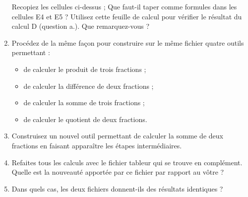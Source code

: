 \begin{TP}
\begin{enumerate}
    Recopiez les cellules ci-dessus ;
    Que faut-il taper comme formules dans les cellules E4 et E5 ?
    Utilisez cette feuille de calcul pour vérifier le résultat du calcul D (question a.). Que remarquez-vous ?
    \item Procédez de la même façon pour construire sur le même fichier quatre outils permettant :
    \begin{itemize}
        \item de calculer le produit de trois fractions ;
        \item de calculer la différence de deux fractions ;
        \item de calculer la somme de trois fractions ;
        \item de calculer le quotient de deux fractions.
    \end{itemize}
    \item Construisez un nouvel outil permettant de calculer la somme de deux fractions en faisant apparaître les étapes intermédiaires.
    \item Refaites tous les calculs avec le fichier tableur qui se trouve en complément. Quelle est la nouveauté apportée par ce fichier par rapport au vôtre ?
    \item Dans quels cas, les deux fichiers donnent-ils des résultats identiques ?
\end{enumerate}
\end{TP}